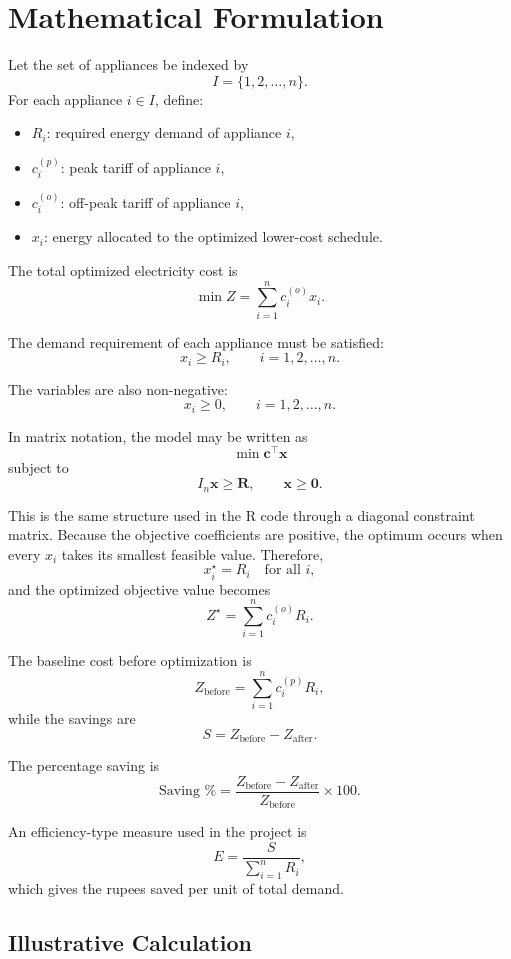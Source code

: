 \documentclass[12pt,a4paper]{article}
\begin{document}
\section{Mathematical Formulation}

Let the set of appliances be indexed by
\[
I=\{1,2,\dots,n\}.
\]
For each appliance \(i \in I\), define:

\begin{itemize}[leftmargin=*]
  \item \(R_i\): required energy demand of appliance \(i\),
  \item \(c_i^{(p)}\): peak tariff of appliance \(i\),
  \item \(c_i^{(o)}\): off-peak tariff of appliance \(i\),
  \item \(x_i\): energy allocated to the optimized lower-cost schedule.
\end{itemize}

The total optimized electricity cost is
\[
\min Z=\sum_{i=1}^{n} c_i^{(o)}x_i.
\]

The demand requirement of each appliance must be satisfied:
\[
x_i \geq R_i, \qquad i=1,2,\dots,n.
\]

The variables are also non-negative:
\[
x_i \geq 0, \qquad i=1,2,\dots,n.
\]

In matrix notation, the model may be written as
\[
\min \mathbf{c}^{\top}\mathbf{x}
\]
subject to
\[
I_n \mathbf{x}\geq \mathbf{R}, \qquad \mathbf{x}\geq \mathbf{0}.
\]

This is the same structure used in the R code through a diagonal constraint matrix. Because the objective coefficients are positive, the optimum occurs when every \(x_i\) takes its smallest feasible value. Therefore,
\[
x_i^{\star}=R_i \quad \text{for all } i,
\]
and the optimized objective value becomes
\[
Z^{\star}=\sum_{i=1}^{n} c_i^{(o)}R_i.
\]

The baseline cost before optimization is
\[
Z_{\text{before}}=\sum_{i=1}^{n} c_i^{(p)}R_i,
\]
while the savings are
\[
S=Z_{\text{before}}-Z_{\text{after}}.
\]

The percentage saving is
\[
\text{Saving \%}=\frac{Z_{\text{before}}-Z_{\text{after}}}{Z_{\text{before}}}\times 100.
\]

An efficiency-type measure used in the project is
\[
E=\frac{S}{\sum_{i=1}^{n}R_i},
\]
which gives the rupees saved per unit of total demand.

\subsection{Illustrative Calculation}
\end{document}
